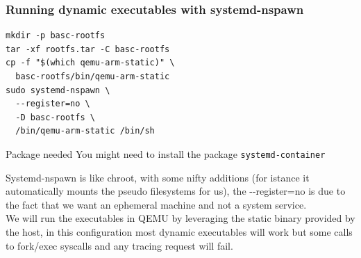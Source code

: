 \begin{frame}[fragile]
  \frametitle{Running dynamic executables with systemd-nspawn}
  \begin{lstlisting}
mkdir -p basc-rootfs
tar -xf rootfs.tar -C basc-rootfs
cp -f "$(which qemu-arm-static)" \
  basc-rootfs/bin/qemu-arm-static
sudo systemd-nspawn \
  --register=no \
  -D basc-rootfs \
  /bin/qemu-arm-static /bin/sh
  \end{lstlisting}
  \begin{alertblock}{Package needed}
  You might need to install the package \texttt{systemd-container}
  \end{alertblock}
\end{frame}
\only<handout> {
  Systemd-nspawn is like chroot, with some nifty additions (for istance it automatically mounts the pseudo filesystems for us),
   the -{}-register=no is due to the fact that we want an ephemeral machine and not a system service. \\
  We will run the executables in QEMU by leveraging the static binary provided by the host, in this configuration
  most dynamic executables will work but some calls to fork/exec syscalls and any tracing request will fail.
}


